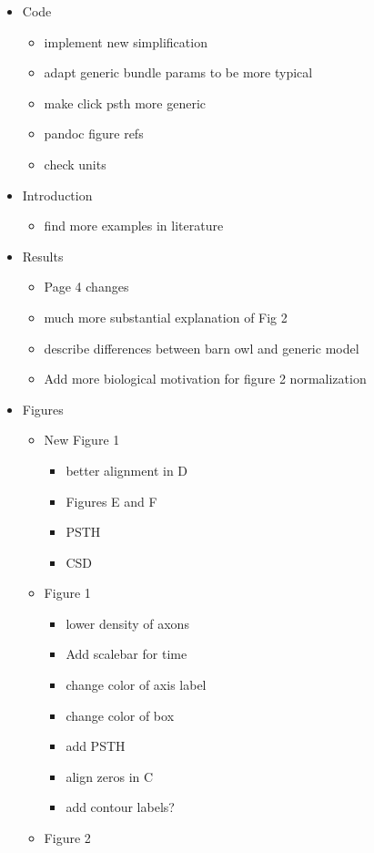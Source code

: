 \documentclass[]{article}
\providecommand{\tightlist}{%
  \setlength{\itemsep}{0pt}\setlength{\parskip}{0pt}}
\begin{document}
\begin{itemize}
\tightlist
\item
  Code

  \begin{itemize}
  \tightlist
  \item
    implement new simplification
  \item
    adapt generic bundle params to be more typical
  \item
    make click psth more generic
  \item
    pandoc figure refs
  \item
    check units
  \end{itemize}
\item
  Introduction

  \begin{itemize}
  \tightlist
  \item
    find more examples in literature
  \end{itemize}
\item
  Results

  \begin{itemize}
  \tightlist
  \item
    Page 4 changes
  \item
    much more substantial explanation of Fig 2
  \item
    describe differences between barn owl and generic model
  \item
    Add more biological motivation for figure 2 normalization
  \end{itemize}
\item
  Figures

  \begin{itemize}
  \tightlist
  \item
    New Figure 1

    \begin{itemize}
    \tightlist
    \item
      better alignment in D
    \item
      Figures E and F
    \item
      PSTH
    \item
      CSD
    \end{itemize}
  \item
    Figure 1

    \begin{itemize}
    \tightlist
    \item
      lower density of axons
    \item
      Add scalebar for time
    \item
      change color of axis label
    \item
      change color of box
    \item
      add PSTH
    \item
      align zeros in C
    \item
      add contour labels?
    \end{itemize}
  \item
    Figure 2


\end{itemize}
\end{itemize}
\end{document}
